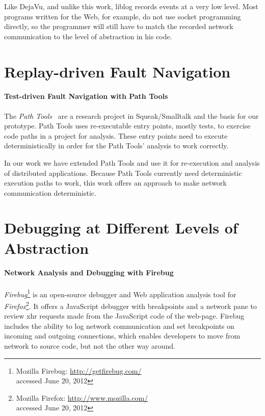 Like DejaVu, and unlike this work, liblog records events at a very low
level. Most programs written for the Web, for example, do not use
socket programming directly, so the programmer will still have to
match the recorded network communication to the level of abstraction
in his code.

\section{Replay-driven Fault Navigation}
\label{sec:replay-driven-fault-1}

\paragraph{Test-driven Fault Navigation with Path Tools}
\label{sec:pathtools}

The \emph{Path Tools}~\cite{Perscheid} are a research project in
Squeak/Smalltalk and the basis for our prototype. Path Tools uses
re-executable entry points, mostly tests, to exercise code paths in a
project for analysis. These entry points need to execute
deterministically in order for the Path Tools' analysis to work
correctly.

In our work we have extended Path Tools and use it for re-execution
and analysis of distributed applications. Because Path Tools currently
need deterministic execution paths to work, this work offers an
approach to make network communication deterministic.

\section{Debugging at Different Levels of Abstraction}
\label{sec:debugg-at-diff-1}

\paragraph{Network Analysis and Debugging with Firebug}
\label{sec:firebug}

\emph{Firebug}\footnote{Mozilla Firebug:
  \url{http://getfirebug.com/}\\
  accessed June 20, 2012} is an open-source debugger and Web
application analysis tool for \emph{Firefox}\footnote{Mozilla Firefox:
  \url{http://www.mozilla.com/}\\
  accessed June 20, 2012}. It offers a JavaScript debugger with
breakpoints and a network pane to review \ac{xhr} requests made from
the JavaScript code of the web-page. Firebug includes the ability to
log network communication and set breakpoints on incoming and outgoing
connections, which enables developers to move from network to source
code, but not the other way around.

